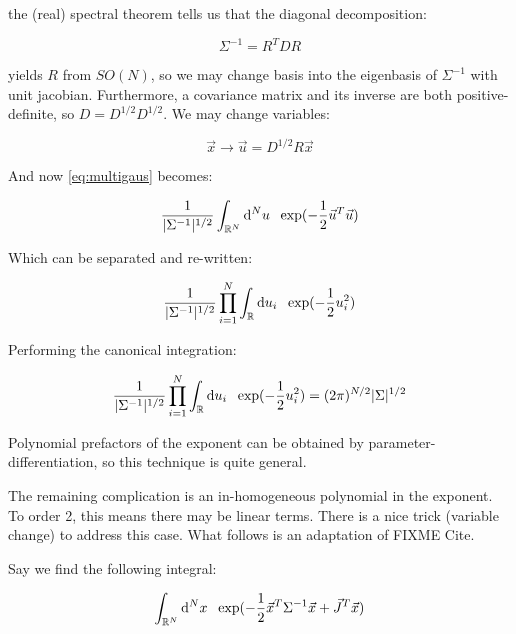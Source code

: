 \documentclass[10pt,letterpaper]{article}
\def\d{{\rm d}}  %
\begin{document}
the (real) spectral theorem tells us that the diagonal decomposition:

\begin{equation} \label{eq:diagdecomp}
\Sigma^{-1} = R^T D R
\end{equation} 

yields $R$ from $SO(N)$, so we may change basis into the eigenbasis of $\Sigma^{-1}$ with unit jacobian.
Furthermore, a covariance matrix and its inverse are both positive-definite, so $D= D^{1/2} D^{1/2}$.
We may change variables:

\begin{equation} \label{eq:changevar}
\vec{x} \rightarrow \vec{u} = D^{1/2} R \vec{x}
\end{equation}

And now \ref{eq:multigaus} becomes:

\begin{equation} \label{eq:multigaus_trans}
\frac{1}{|\Sigma^{-1}|^{1/2}} \int_{\mathbb{R}^N} \d^N u \hspace{0.5pc} \exp(-\frac{1}{2} \vec{u}^T \vec{u})
\end{equation}

Which can be separated and re-written:

\begin{equation} \label{eq:multigaus_trans}
\frac{1}{|\Sigma^{-1}|^{1/2}} \prod_{i=1}^{N} \int_{\mathbb{R}} \d u_{i} \hspace{0.5pc} \exp(-\frac{1}{2} u_{i}^2)
\end{equation}

Performing the canonical integration:

\begin{equation} \label{eq:multigaus_final}
\frac{1}{|\Sigma^{-1}|^{1/2}} \prod_{i=1}^{N} \int_{\mathbb{R}} \d u_{i} \hspace{0.5pc} \exp(-\frac{1}{2} u_{i}^2) = (2\pi)^{N/2} |\Sigma|^{1/2}
\end{equation}

Polynomial prefactors of the exponent can be obtained by parameter-differentiation, so this technique is quite general. 

The remaining complication is an in-homogeneous polynomial in the exponent. To order 2, this means there may be linear terms. There is a nice trick (variable change) to address this case. What follows is an adaptation of FIXME Cite.

Say we find the following integral:


\begin{equation} \label{eq:multigaus_linterm}
\int_{\mathbb{R}^N} \d^N x \hspace{0.5pc} \exp(-\frac{1}{2} \vec{x}^T \Sigma^{-1} \vec{x} + \vec{J}^T \vec{x})
\end{equation}
\end{document}
